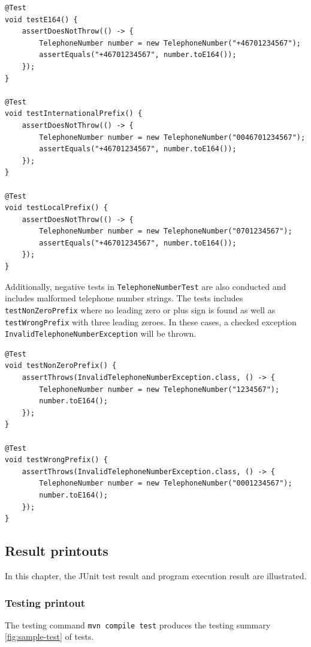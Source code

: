 \documentclass[a4paper]{scrartcl}
\begin{document}
\begin{lstlisting}[style=javastyle, caption={Positive test cases for E164 telephone number normalization in \texttt{TelephoneNumberTest}}]
@Test
void testE164() {
    assertDoesNotThrow(() -> {
        TelephoneNumber number = new TelephoneNumber("+46701234567");
        assertEquals("+46701234567", number.toE164());
    });
}

@Test
void testInternationalPrefix() {
    assertDoesNotThrow(() -> {
        TelephoneNumber number = new TelephoneNumber("0046701234567");
        assertEquals("+46701234567", number.toE164());
    });
}

@Test
void testLocalPrefix() {
    assertDoesNotThrow(() -> {
        TelephoneNumber number = new TelephoneNumber("0701234567");
        assertEquals("+46701234567", number.toE164());
    });
}
\end{lstlisting}

Additionally, negative tests in \texttt{TelephoneNumberTest} are also conducted and includes malformed telephone number strings. The tests includes \texttt{testNonZeroPrefix} where no leading zero or plus sign is found as well as \texttt{testWrongPrefix} with three leading zeroes. In these cases, a checked exception \texttt{InvalidTelephoneNumberException} will be thrown.

\begin{lstlisting}[style=javastyle, caption={Negative test cases for malformed telephone numbers in \texttt{TelephoneNumberTest}}]
@Test
void testNonZeroPrefix() {
    assertThrows(InvalidTelephoneNumberException.class, () -> {
        TelephoneNumber number = new TelephoneNumber("1234567");
        number.toE164();
    });
}

@Test
void testWrongPrefix() {
    assertThrows(InvalidTelephoneNumberException.class, () -> {
        TelephoneNumber number = new TelephoneNumber("0001234567");
        number.toE164();
    });
}
\end{lstlisting}

\subsection{Result printouts}
In this chapter, the JUnit test result and program execution result are illustrated.

\subsubsection{Testing printout}
The testing command \texttt{mvn compile test} produces the testing summary \ref{fig:sample-test} of tests.
\end{document}
